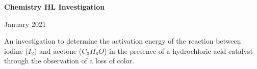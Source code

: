 \begin{titlepage}
    \begin{center}
        \vspace*{3cm}
        

        \huge
        \textbf{Chemistry HL Investigation}

        \vspace{1cm}

        \Large
        January 2021

        \vspace{0.5cm}

        An investigation to determine the activation energy of the reaction between iodine ($I_2$) and acetone ($C_3H_6O$) in the presence of a hydrochloric acid catalyst through the observation of a loss of color.
             
    \end{center}
\end{titlepage}